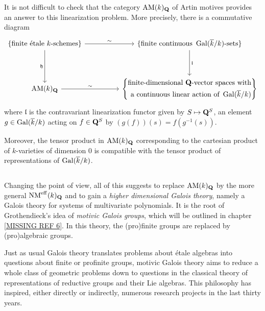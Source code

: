 \documentclass[../main.tex]{subfiles}
\begin{document}
It is not difficult to check that the category $\operatorname{AM}(k)_{\mathbf{Q}}$ of Artin motives provides an answer to this linearization problem. More precisely, there is a commutative diagram
\[\begin{tikzcd}
	{\{\text{finite étale }k\text{-schemes}\}} && {\{\text{finite continuous }\Gal(\overline{k}/k)\text{-sets}\}} \\
	\\
	{\AM(k)_{\Q}} && \left\{\begin{aligned}\text{finite-dimensional }\Q\text{-vector spaces with}\\
        \text{a continuous linear action of }\Gal(\overline{k}/k)\end{aligned}\right\}
	\arrow["\sim", from=1-1, to=1-3]
	\arrow["\h"', from=1-1, to=3-1]
	\arrow["{\mathfrak{l}}", from=1-3, to=3-3]
	\arrow["\sim", from=3-1, to=3-3]
\end{tikzcd}\]
where $\mathfrak{l}$ is the contravariant linearization functor given by $S \mapsto \mathbf{Q}^S$, an element $g \in \operatorname{Gal}(\overline{k}/k)$ acting on $f \in \mathbf{Q}^S$ by $(g(f))(s) = f(g^{-1}(s))$.

Moreover, the tensor product in $\operatorname{AM}(k)_{\mathbf{Q}}$ corresponding to the cartesian product of $k$-varieties of dimension $0$ is compatible with the tensor product of representations of $\operatorname{Gal}(\overline{k}/k)$.

\subsection{} Changing the point of view, all of this suggests to replace $\operatorname{AM}(k)_{\mathbf{Q}}$ by the more general $\operatorname{NM}^{\mathrm{eff}}(k)_{\mathbf{Q}}$ and to gain a \emph{higher dimensional Galois theory}, namely a Galois theory for systems of multivariate polynomials.
It is the root of Grothendieck's idea of \emph{motivic Galois groups}, which will be outlined in chapter \ref{MISSING REF 6}. In this theory, the (pro)finite groups are replaced by (pro)algebraic groups.

Just as usual Galois theory translates problems about étale algebras into questions about finite or profinite groups, motivic Galois theory aims to reduce a whole class of geometric problems down to questions in the classical theory of representations of reductive groups and their Lie algebras.
This philosophy has inspired, either directly or indirectly, numerous research projects in the last thirty years.
\end{document}
